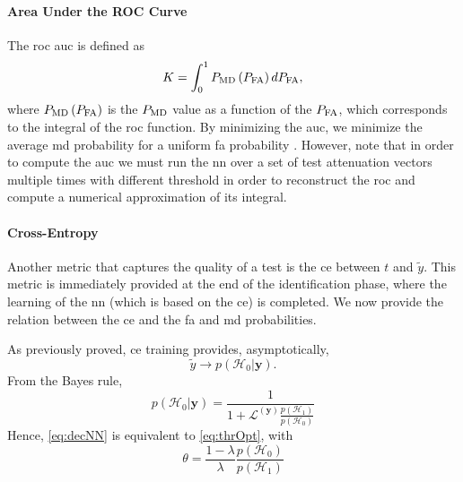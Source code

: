 \documentclass[conference,draftcls,onecolumn]{IEEEtran}
\begin{document}
\paragraph{Area Under the ROC Curve} The \ac{roc} \ac{auc} is defined as 
\begin{equation}
    K  = \int_{0}^{1} P_{\rm MD}\left(P_{\rm FA}\right) d P_{\rm FA},
\end{equation}
where $P_{\rm MD}\left(P_{\rm FA}\right)$ is the $P_{\rm MD}$ value as a function of the $P_{\rm FA}$, which corresponds to the integral of the \ac{roc} function. By minimizing the \ac{auc}, we minimize the average \ac{md} probability for a uniform \ac{fa} probability
. However, note that in order to compute the \ac{auc} we must run the \ac{nn} over a set of test attenuation vectors multiple times with different threshold in order to reconstruct the \ac{roc} and compute a numerical approximation of its integral.

\paragraph{Cross-Entropy} Another metric that captures the quality of a test is the \ac{ce} between $t$ and $\tilde{y}$. This metric is immediately provided at the end of the identification phase, where the learning of the \ac{nn} (which is based on the \ac{ce}) is completed. We now provide the relation between the \ac{ce} and the \ac{fa} and \ac{md} probabilities.

As previously proved, {\ac{ce}} training provides, asymptotically, 
\begin{equation}
	\tilde{y} \to p(\mathcal{H}_0|\bm y).	
\end{equation}
From the Bayes rule, 
\begin{equation}
	p(\mathcal{H}_0| \bm y) = \frac{1}{1+\mathcal{L}^{(\bm y)} \frac{p(\mathcal{H}_1)}{p(\mathcal{H}_0)}}	
\end{equation}
Hence, \eqref{eq:decNN} is equivalent to \eqref{eq:thrOpt}, with
\begin{equation}
	\theta = \frac{1-\lambda}{\lambda} \frac{p(\mathcal{H}_0)}{p(\mathcal{H}_1)}	
\end{equation}
 
\end{document}
